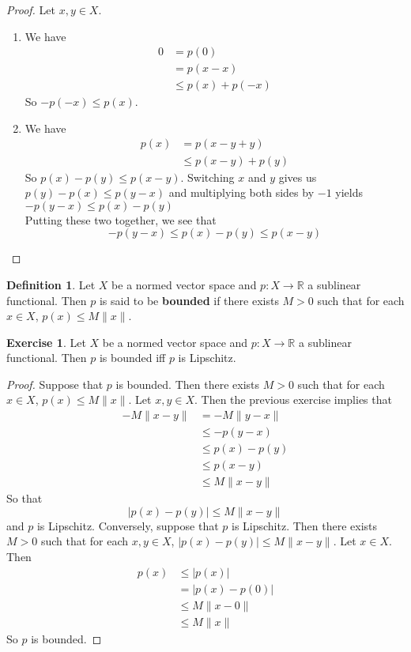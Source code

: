 \documentclass[12pt]{amsart}
\theoremstyle{definition}
\newtheorem{defn}[definition]{Definition}
\theoremstyle{remark}
\theoremstyle{definition}
\newtheorem{ex}[definition]{Exercise}
\newcommand{\R}{\mathbb{R}}
\begin{document}
	\begin{proof}
	Let $x, y \in X$.
	\begin{enumerate}
	\item We have
	\begin{align*}
	0
	&= p(0) \\ 
	&= p(x - x) \\
	& \leq p(x) + p(-x)
	\end{align*}
	So $-p(-x) \leq p(x)$.
	\item We have
	\begin{align*}
	p(x)
	&= p(x -y + y) \\
	& \leq p(x-y) + p(y)
	\end{align*}
	So $p(x) - p(y) \leq p(x-y)$. Switching $x$ and $y$ gives us $p(y) - p(x) \leq p(y-x)$ and multiplying both sides by $-1$ yields $-p(y-x) \leq p(x) - p(y)$ \\ 
	Putting these two together, we see that $$-p(y-x) \leq p(x) - p(y) \leq p(x-y)$$
	\end{enumerate}
	\end{proof}
	
	\begin{defn}
	Let $X$ be a normed vector space and $p:X \rightarrow \R$ a sublinear functional. Then $p$ is said to be \textbf{bounded} if there exists $M >0$ such that for each $x \in X$, $p(x) \leq M\|x\|$. 
	\end{defn}
	
	\begin{ex}
	Let $X$ be a normed vector space and $p:X \rightarrow \R$ a sublinear functional. Then $p$ is bounded iff $p$ is Lipschitz. 
	\end{ex}
	
	\begin{proof}
	Suppose that $p$ is bounded. Then there exists $M >0$ such that for each $x \in X$, $p(x) \leq M\|x\|$. Let $x, y \in X$. Then the previous exercise implies that 
	\begin{align*}
	-M\|x-y\| 
	&= -M\|y-x\| \\
	& \leq -p(y-x) \\
	& \leq p(x)-p(y) \\
	& \leq p(x-y) \\
	& \leq M \| x-y\| 
	\end{align*}
	So that $$|p(x) - p(y)| \leq  M\|x-y\|$$
	and $p$ is Lipschitz.
	Conversely, suppose that $p$ is Lipschitz. Then there exists $M >0 $ such that for each $x ,y \in X$, $|p(x) - p(y)| \leq  M\|x-y\|$. Let $x \in X$. Then 
	\begin{align*}
	p(x) 
	& \leq |p(x)| \\
	& = |p(x) - p(0)| \\
	& \leq M\|x - 0\| \\
	  & \leq M\|x\| 
	\end{align*}
	So $p$ is bounded.
	\end{proof}
	
\end{document}
